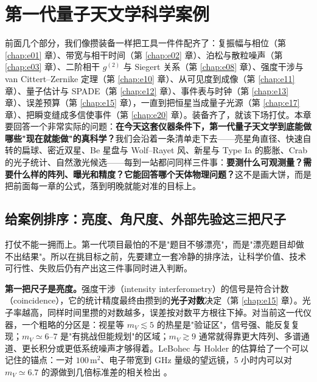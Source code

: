 \chapter{第一代量子天文学科学案例}
\label{chap:e25}

\begin{chapteropening}
前面几个部分，我们像攒装备一样把工具一件件配齐了：复振幅与相位（第 \ref{chap:e01} 章）、带宽与相干时间（第 \ref{chap:e02} 章）、泊松与散粒噪声（第 \ref{chap:e03} 章）、二阶相干 \(g^{(2)}\) 与 Siegert 关系（第 \ref{chap:e08} 章）、强度干涉与 van Cittert--Zernike 定理（第 \ref{chap:e10} 章）、从可见度到成像（第 \ref{chap:e11} 章）、量子估计与 SPADE（第 \ref{chap:e12} 章）、事件表与时钟（第 \ref{chap:e13} 章）、误差预算（第 \ref{chap:e15} 章），一直到把恒星当成量子光源（第 \ref{chap:e17} 章）、把瞬变缝成多信使事件（第 \ref{chap:e20} 章）。装备齐了，就该下场打仗。本章要回答一个非常实际的问题：\textbf{在今天这套仪器条件下，第一代量子天文学到底能做哪些"现在就能做"的真科学？}我们会沿着一条清单走下去——亮星角直径、快速自转的扁球、密近双星、Be 星盘与 Wolf--Rayet 风、新星与 Type Ia 的膨胀、Crab 的光子统计、自然激光候选——每到一站都问同样三件事：\textbf{要测什么可观测量？需要什么样的阵列、曝光和精度？它能回答哪个天体物理问题？}这不是画大饼，而是把前面每一章的公式，落到明晚就能对准的目标上。
\end{chapteropening}

\section{给案例排序：亮度、角尺度、外部先验这三把尺子}
\label{sec:e25-triage}

打仗不能一拥而上。第一代项目最怕的不是"题目不够漂亮"，而是"漂亮题目却做不出结果"。所以在挑目标之前，先要建立一套冷静的排序法，让科学价值、技术可行性、失败后仍有产出这三件事同时进入判断。

\textbf{第一把尺子是亮度。}强度干涉（intensity interferometry）的信号是符合计数（coincidence），它的统计精度最终由攒到的\textbf{光子对数}决定（第 \ref{chap:e15} 章）。光子率越高，同样时间里攒的对数越多，误差按对数平方根往下掉。对当前这一代仪器，一个粗略的分区是：视星等 \(m_V\lesssim5\) 的热星是"验证区"，信号强、能反复复现；\(m_V\simeq6\text{--}7\) 是"有挑战但能规划"的区域；\(m_V\gtrsim9\) 通常就得靠更大阵列、多谱通道、更长积分或更低系统噪声才够得着。LeBohec 与 Holder 的估算给了一个可以记住的锚点：一对 \(100\,\mathrm{m^2}\)、电子带宽到 GHz 量级的望远镜，5 小时内可以对 \(m_V\simeq6.7\) 的源做到几倍标准差的相关检出 \citep{2006ApJ...649..399L,2013APh....43..331D}。

